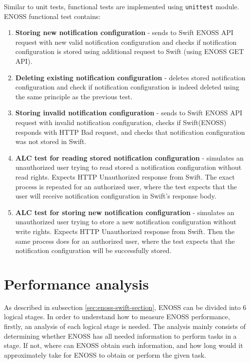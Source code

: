     Similar to unit tests, functional tests are implemented using \texttt{unittest} module. ENOSS functional test contains:
    \begin{enumerate}
        \item \textbf{Storing new notification configuration} - sends to Swift ENOSS API request with new valid notification configuration and checks if notification configuration is stored using additional request to Swift (using ENOSS GET API).
        \item \textbf{Deleting existing notification configuration} - deletes stored notification configuration and check if notification configuration is indeed deleted using the same principle as the previous test.
        \item \textbf{Storing invalid notification configuration} - sends to Swift ENOSS API request with invalid notification configuration, checks if Swift(ENOSS) responds with HTTP Bad request, and checks that notification configuration was not stored in Swift.
        \item \textbf{ALC test for reading stored notification configuration} - simulates an unauthorized user trying to read stored a notification configuration without read rights. Expects HTTP Unauthorized response from Swift. The exact process is repeated for an authorized user, where the test expects that the user will receive notification configuration in Swift's response body.
        \item \textbf{ALC test for storing new notification configuration} - simulates an unauthorized user trying to store a new notification configuration without write rights. Expects HTTP Unauthorized response from Swift. Then the same process does for an authorized user, where the test expects that the notification configuration will be successfully stored.
    \end{enumerate}
\section{Performance analysis}
    As described in subsection \ref{sec:enoss-swift-section}, ENOSS can be divided into 6 logical stages. In order to understand how to measure ENOSS performance, firstly, an analysis of each logical stage is needed. The analysis mainly consists of determining whether ENOSS has all needed information to perform tasks in a stage. If not, where can ENOSS obtain such information, and how long would it approximately take for ENOSS to obtain or perform the given task.

